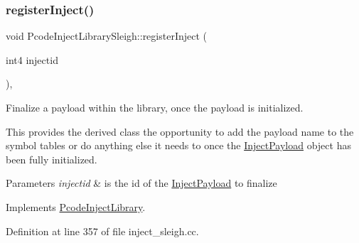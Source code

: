 \subsubsection{\texorpdfstring{registerInject()}{registerInject()}}
{\footnotesize\ttfamily void Pcode\+Inject\+Library\+Sleigh\+::register\+Inject (\begin{DoxyParamCaption}\item[{int4}]{injectid }\end{DoxyParamCaption})\hspace{0.3cm}{\ttfamily [protected]}, {\ttfamily [virtual]}}



Finalize a payload within the library, once the payload is initialized. 

This provides the derived class the opportunity to add the payload name to the symbol tables or do anything else it needs to once the \mbox{\hyperlink{class_inject_payload}{Inject\+Payload}} object has been fully initialized. 
\begin{DoxyParams}{Parameters}
{\em injectid} & is the id of the \mbox{\hyperlink{class_inject_payload}{Inject\+Payload}} to finalize \\
\hline
\end{DoxyParams}


Implements \mbox{\hyperlink{class_pcode_inject_library_a0b75b562fb736f23269114fec5ca36d9}{Pcode\+Inject\+Library}}.



Definition at line 357 of file inject\+\_\+sleigh.\+cc.

